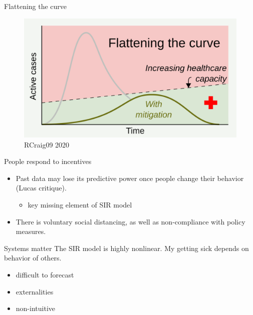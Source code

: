 \documentclass[
  ignorenonframetext,
  aspectratio=1610,
]{beamer}
\providecommand{\tightlist}{%
  \setlength{\itemsep}{0pt}\setlength{\parskip}{0pt}}
\begin{document}
\begin{frame}{Flattening the curve}
\protect\hypertarget{flattening-the-curve-1}{}
\begin{figure}
\centering
\includegraphics{exhibit/fig/flatten2.png}
\caption{RCraig09 2020}
\end{figure}
\end{frame}

\begin{frame}{People respond to incentives}
\protect\hypertarget{people-respond-to-incentives}{}
\begin{itemize}
\tightlist
\item
  Past data may lose its predictive power once people change their
  behavior (Lucas critique).

  \begin{itemize}
  \tightlist
  \item
    key missing element of SIR model
  \end{itemize}
\item
  There is voluntary social distancing, as well as non-compliance with
  policy measures.
\end{itemize}
\end{frame}

\begin{frame}{Systems matter}
\protect\hypertarget{systems-matter}{}
The SIR model is highly nonlinear. My getting sick depends on behavior
of others.

\begin{itemize}
\tightlist
\item
  difficult to forecast
\item
  externalities
\item
  non-intuitive
\end{itemize}
\end{frame}
\end{document}
